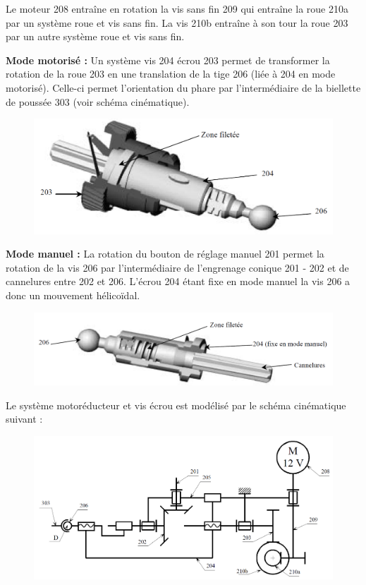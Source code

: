 Le moteur 208 entraîne en rotation la vis sans fin 209 qui entraîne la roue 210a par un système roue et vis sans fin. La vis 210b entraîne à son tour la roue 203 par un autre système roue et vis sans fin.

\textbf{Mode motorisé :} Un système vis 204 écrou 203 permet de transformer la rotation de la roue 203 en une translation de la tige 206 (liée à 204 en mode motorisé). Celle-ci permet l'orientation du phare par l'intermédiaire de la biellette de poussée 303 (voir schéma cinématique).

\begin{figure}[!h]
  \centering
  \includegraphics[width=0.6\linewidth]{img/phare8}
  \label{phare8}
\end{figure}

\textbf{Mode manuel :} La rotation du bouton de réglage manuel 201 permet la rotation de la vis 206 par l'intermédiaire de l'engrenage conique 201 - 202 et de cannelures entre 202 et 206. L'écrou 204 étant fixe en mode manuel la vis 206 a donc un mouvement hélicoïdal.

\begin{figure}[!h]
  \centering
  \includegraphics[width=0.6\linewidth]{img/phare9}
  \label{phare9}
\end{figure}

Le système motoréducteur et vis écrou est modélisé par le schéma cinématique suivant :

\begin{figure}[!h]
  \centering
  \includegraphics[width=0.6\linewidth]{img/phare10}
  \label{phare10}
\end{figure}

